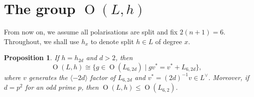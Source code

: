 \documentclass[11pt]{amsart}
\newtheorem{prop}[thm]{Proposition}
\newcommand{\la}{\langle}
\newcommand{\ra}{\rangle}
\newcommand{\opn}{\operatorname}
\begin{document}
\section{The group $\opn{O}(L, h)$}
From now on, we assume all polarisations are split and fix $2(n+1)=6$.
Throughout, we shall use $h_x$ to denote split $h \in L$ of degree $x$.
\begin{prop}\label{modgroup}
If $h=h_{2d}$ and $d > 2$, then 
\begin{equation*}
\opn{O}(L, h) \cong \{ g \in \opn{O}(L_{6, 2d}) \mid g v^* = v^* + L_{6,2d} \},
\end{equation*}
where $v$ generates the $\la -2d \ra$ factor of $L_{6,2d}$ and $v^* = (2d)^{-1} v \in L^{\vee}$.
Moreover, if $d=p^2$ for an odd prime $p$, then $\opn{O}(L, h) \leq \opn{O}(L_{6, 2})$.
\end{prop}
\end{document}
